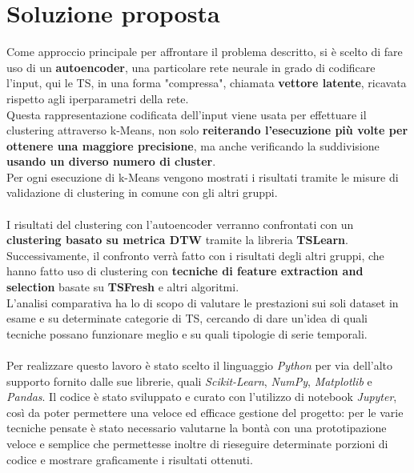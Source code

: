 \section{Soluzione proposta}
Come approccio principale per affrontare il problema descritto, si è scelto di fare uso di un \textbf{autoencoder}, una particolare rete neurale in grado di codificare l'input, qui le TS, in una forma "compressa", chiamata \textbf{vettore latente}, ricavata rispetto agli iperparametri della rete.\\
Questa rappresentazione codificata dell'input viene usata per effettuare il clustering attraverso k-Means, non solo \textbf{reiterando l'esecuzione più volte per ottenere una maggiore precisione}, ma anche verificando la suddivisione \textbf{usando un diverso numero di cluster}.\\
Per ogni esecuzione di k-Means vengono mostrati i risultati tramite le misure di validazione di clustering in comune con gli altri gruppi.\\
\\
I risultati del clustering con l'autoencoder verranno confrontati con un \textbf{clustering basato su metrica DTW} tramite la libreria \textbf{TSLearn}.\\
Successivamente, il confronto verrà fatto con i risultati degli altri gruppi, che hanno fatto uso di clustering con \textbf{tecniche di feature extraction and selection} basate su \textbf{TSFresh} e altri algoritmi.\\
L'analisi comparativa ha lo di scopo di valutare le prestazioni sui soli dataset in esame e su determinate categorie di TS, cercando di dare un'idea di quali tecniche possano funzionare meglio e su quali tipologie di serie temporali.\\
\\
Per realizzare questo lavoro è stato scelto il linguaggio \textit{Python} per via dell'alto supporto fornito dalle sue librerie, quali \textit{Scikit-Learn}\cite{sklearn_api}, \textit{NumPy}\cite{numpy}, \textit{Matplotlib}\cite{matplotlib} e \textit{Pandas}\cite{pandas}. Il codice è stato sviluppato e curato con l'utilizzo di notebook \textit{Jupyter}, così da poter permettere una veloce ed efficace gestione del progetto: per le varie tecniche pensate è stato necessario valutarne la bontà con una prototipazione veloce e semplice che permettesse inoltre di rieseguire determinate porzioni di codice e mostrare graficamente i risultati ottenuti.\\

